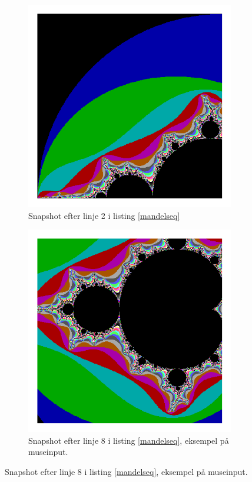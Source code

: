 \begin{figure}
\begin{subfigure}[b]{0.3\textwidth}
        \includegraphics[width=\textwidth]{pictures/M2.png}
        \caption{ Snapshot efter linje 2 i listing \ref{mandelseq} }
    \end{subfigure}
    \begin{subfigure}[b]{0.3\textwidth}
        \centering
        \includegraphics[width=\textwidth]{pictures/M3.png}
        \caption{ Snapshot efter linje 8 i listing \ref{mandelseq}, eksempel på museinput. }
    \end{subfigure}


\end{figure}
